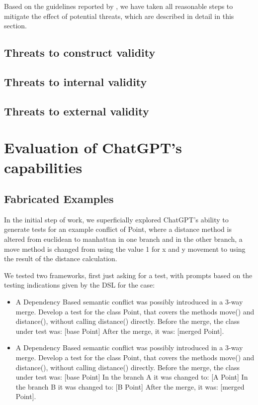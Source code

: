 Based on the guidelines reported by \citet{wohlin2012experimentation}, we have
taken all reasonable steps to mitigate the effect of potential threats, which
are described in detail in this section.

\subsection{Threats to construct validity}
%

\subsection{Threats to internal validity}
%

\subsection{Threats to external validity}
%





\section{Evaluation of ChatGPT's capabilities}

\subsection{Fabricated Examples}

In the initial step of work, we superficially explored ChatGPT's ability to generate tests for an example conflict of Point, where a distance method is altered from euclidean to manhattan in one branch and in the other branch, a move method is changed from using the value 1 for x and y movement to using the result of the distance calculation.

We tested two frameworks, first just asking for a test, with prompts based on the testing indications given by the DSL for the case:

\begin{itemize}
  \item A Dependency Based semantic conflict was possibly introduced in a 3-way merge. Develop a test for the class Point, that covers the methods move() and distance(), without calling distance() directly.
Before the merge, the class under test was: [base Point]
After the merge, it was: [merged Point].
  \item A Dependency Based semantic conflict was possibly introduced in a 3-way merge. Develop a test for the class Point, that covers the methods move() and distance(), without calling distance() directly.
Before the merge, the class under test was: [base Point]
In the branch A it was changed to: [A Point]
In the branch B it was changed to: [B Point]
After the merge, it was: [merged Point].

\end{itemize}

